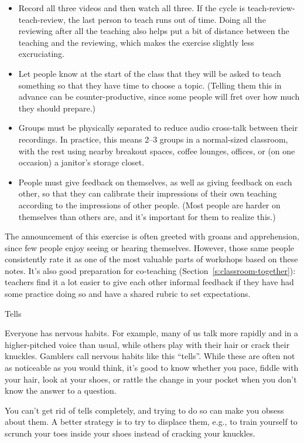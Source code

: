 \begin{itemize}
\item
  Record all three videos and then watch all three. If the cycle is
  teach-review-teach-review, the last person to teach runs out of
  time. Doing all the reviewing after all the teaching also helps put
  a bit of distance between the teaching and the reviewing, which
  makes the exercise slightly less excruciating.
\item
  Let people know at the start of the class that they will be asked to
  teach something so that they have time to choose a topic. (Telling
  them this in advance can be counter-productive, since some people
  will fret over how much they should prepare.)
\item
  Groups must be physically separated to reduce audio cross-talk
  between their recordings. In practice, this means 2--3 groups in a
  normal-sized classroom, with the rest using nearby breakout spaces,
  coffee lounges, offices, or (on one occasion) a janitor's storage
  closet.
\item
  People must give feedback on themselves, as well as giving feedback
  on each other, so that they can calibrate their impressions of their
  own teaching according to the impressions of other people. (Most
  people are harder on themselves than others are, and it's important
  for them to realize this.)
\end{itemize}

The announcement of this exercise is often greeted with groans and
apprehension, since few people enjoy seeing or hearing themselves.
However, those same people consistently rate it as one of the most
valuable parts of workshops based on these notes. It's also good
preparation for co-teaching (Section~\ref{s:classroom-together}):
teachers find it a lot easier to give each other informal feedback if
they have had some practice doing so and have a shared rubric to set
expectations.

\begin{aside}{Tells}

Everyone has nervous habits. For example, many of us talk more rapidly
and in a higher-pitched voice than usual, while others play with their
hair or crack their knuckles. Gamblers call nervous habits like this
``tells''. While these are often not as noticeable as you would think,
it's good to know whether you pace, fiddle with your hair, look at
your shoes, or rattle the change in your pocket when you don't know
the answer to a question.

You can't get rid of tells completely, and trying to do so can make
you obsess about them. A better strategy is to try to displace them,
e.g., to train yourself to scrunch your toes inside your shoes instead
of cracking your knuckles.

\end{aside}

